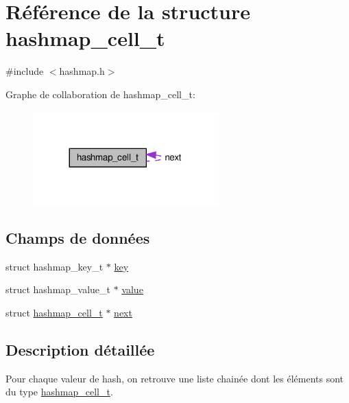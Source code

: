\hypertarget{structhashmap__cell__t}{\section{Référence de la structure hashmap\+\_\+cell\+\_\+t}
\label{structhashmap__cell__t}
}


{\ttfamily \#include $<$hashmap.\+h$>$}



Graphe de collaboration de hashmap\+\_\+cell\+\_\+t\+:\nopagebreak
\begin{figure}[H]
\begin{center}
\leavevmode
\includegraphics[width=203pt]{structhashmap__cell__t__coll__graph}
\end{center}
\end{figure}
\subsection*{Champs de données}
\begin{DoxyCompactItemize}
\item 
struct hashmap\+\_\+key\+\_\+t $\ast$ \hyperlink{structhashmap__cell__t_a18fa668e172072e9bff5e92e52d9f3af}{key}
\item 
struct hashmap\+\_\+value\+\_\+t $\ast$ \hyperlink{structhashmap__cell__t_aa0758cf139adb3747a846e539d01d75d}{value}
\item 
struct \hyperlink{structhashmap__cell__t}{hashmap\+\_\+cell\+\_\+t} $\ast$ \hyperlink{structhashmap__cell__t_afea1a8c217d80c95efa5b4a89ea07bf2}{next}
\end{DoxyCompactItemize}


\subsection{Description détaillée}
Pour chaque valeur de hash, on retrouve une liste chainée dont les éléments sont du type \hyperlink{structhashmap__cell__t}{hashmap\+\_\+cell\+\_\+t}. 

